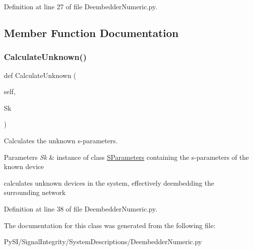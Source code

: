 Definition at line 27 of file Deembedder\+Numeric.\+py.



\subsection{Member Function Documentation}
\mbox{\label{classSignalIntegrity_1_1SystemDescriptions_1_1DeembedderNumeric_1_1DeembedderNumeric_a35720c536433da8712e515f3c4d6ecf6}} 
\subsubsection{\texorpdfstring{Calculate\+Unknown()}{CalculateUnknown()}}
{\footnotesize\ttfamily def Calculate\+Unknown (\begin{DoxyParamCaption}\item[{}]{self,  }\item[{}]{Sk }\end{DoxyParamCaption})}



Calculates the unknown s-\/parameters. 


\begin{DoxyParams}{Parameters}
{\em Sk} & instance of class \hyperlink{namespaceSignalIntegrity_1_1SParameters}{S\+Parameters} containing the s-\/parameters of the known device\\
\hline
\end{DoxyParams}
calculates unknown devices in the system, effectively deembedding the surrounding network 

Definition at line 38 of file Deembedder\+Numeric.\+py.



The documentation for this class was generated from the following file\+:\begin{DoxyCompactItemize}
\item 
Py\+S\+I/\+Signal\+Integrity/\+System\+Descriptions/Deembedder\+Numeric.\+py\end{DoxyCompactItemize}
